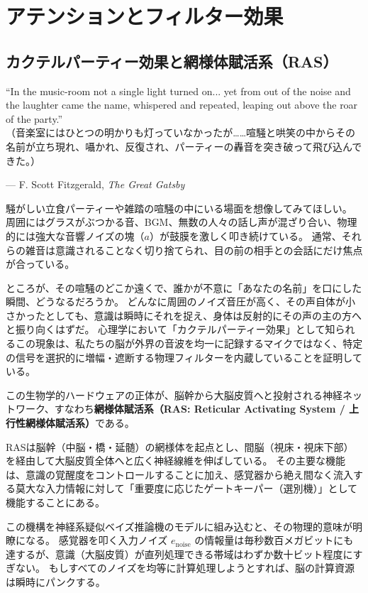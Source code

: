 \chapter{アテンションとフィルター効果}
\section{カクテルパーティー効果と網様体賦活系（RAS）}
\epigraph{``In the music-room not a single light turned on... yet from out of the noise and the laughter came the name, whispered and repeated, leaping out above the roar of the party.''\\
（音楽室にはひとつの明かりも灯っていなかったが……喧騒と哄笑の中からその名前が立ち現れ、囁かれ、反復され、パーティーの轟音を突き破って飛び込んできた。）}{--- F. Scott Fitzgerald, \textit{The Great Gatsby}}

騒がしい立食パーティーや雑踏の喧騒の中にいる場面を想像してみてほしい。
周囲にはグラスがぶつかる音、BGM、無数の人々の話し声が混ざり合い、物理的には強大な音響ノイズの塊（$a$）が鼓膜を激しく叩き続けている。
通常、それらの雑音は意識されることなく切り捨てられ、目の前の相手との会話にだけ焦点が合っている。

ところが、その喧騒のどこか遠くで、誰かが不意に「あなたの名前」を口にした瞬間、どうなるだろうか。
どんなに周囲のノイズ音圧が高く、その声自体が小さかったとしても、意識は瞬時にそれを捉え、身体は反射的にその声の主の方へと振り向くはずだ。
心理学において「カクテルパーティー効果」として知られるこの現象は、私たちの脳が外界の音波を均一に記録するマイクではなく、特定の信号を選択的に増幅・遮断する物理フィルターを内蔵していることを証明している。

この生物学的ハードウェアの正体が、脳幹から大脳皮質へと投射される神経ネットワーク、すなわち\textbf{網様体賦活系（RAS: Reticular Activating System / 上行性網様体賦活系）}である。

RASは脳幹（中脳・橋・延髄）の網様体を起点とし、間脳（視床・視床下部）を経由して大脳皮質全体へと広く神経線維を伸ばしている。
その主要な機能は、意識の覚醒度をコントロールすることに加え、感覚器から絶え間なく流入する莫大な入力情報に対して「重要度に応じたゲートキーパー（選別機）」として機能することにある。

この機構を神経系疑似ベイズ推論機のモデルに組み込むと、その物理的意味が明瞭になる。
感覚器を叩く入力ノイズ $e_{\mathrm{noise}}$ の情報量は毎秒数百メガビットにも達するが、意識（大脳皮質）が直列処理できる帯域はわずか数十ビット程度にすぎない。
もしすべてのノイズを均等に計算処理しようとすれば、脳の計算資源は瞬時にパンクする。

